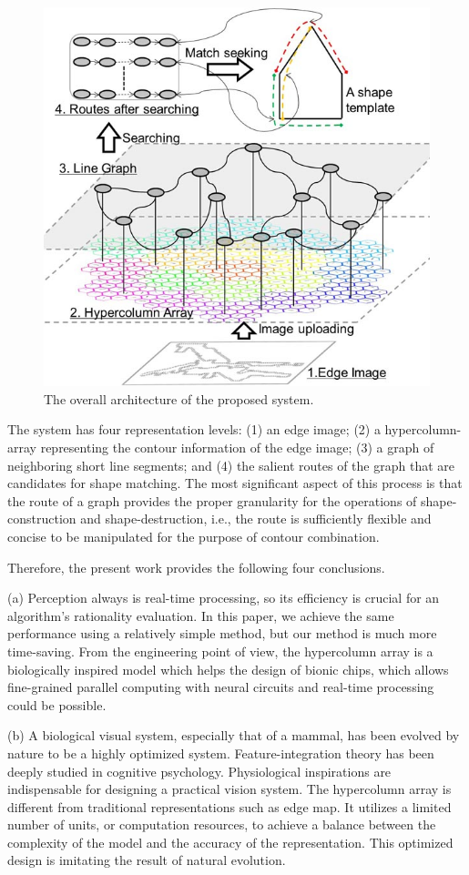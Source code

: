 \documentclass{article}
\begin{document}
\begin{figure}[!t]
\centering
\includegraphics[width=0.6\linewidth]{images/fig24.jpg}
\caption{The overall architecture of the proposed system.}
\label{fig:24}
\end{figure}

The system has four representation levels: 
(1) an edge image; (2) a hypercolumn-array representing the contour information of the edge image; 
(3) a graph of neighboring short line segments; 
and (4) the salient routes of the graph that are candidates for shape matching. 
The most significant aspect of this process is that the route of a graph provides the proper granularity for the operations of shape-construction and shape-destruction, i.e., the route is sufficiently flexible and concise to be manipulated for the purpose of contour combination.

Therefore, the present work provides the following four conclusions.

(a) Perception always is real-time processing, so its efficiency is crucial for an algorithm's rationality evaluation. In this paper, we achieve the same performance using a relatively simple method, 
but our method is much more time-saving. 
From the engineering point of view,
the hypercolumn array is a biologically inspired model which helps the design of bionic chips, 
which allows fine-grained parallel computing with neural circuits and real-time processing could be possible.

(b) A biological visual system, especially that of a mammal, has been evolved by nature to be a highly optimized system.
Feature-integration theory has been deeply studied in cognitive psychology. 
Physiological inspirations are indispensable for designing a practical vision system.
The hypercolumn array is different from traditional representations such as edge map.
It utilizes a limited number of units, or computation resources, 
to achieve a balance between the complexity of the model and the accuracy of the representation. 
This optimized design is imitating the result of natural evolution.
\end{document}
